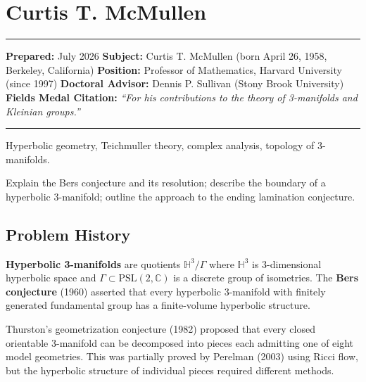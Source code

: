 \chapter{Curtis T. McMullen}\label{ch1998curtistmcmullen:curtis-t-mcmullen-fields-medal-1998-a-comprehensive-report-on-his-work-and-impact}

\begin{center}\rule{0.5\linewidth}{0.5pt}\end{center}

\textbf{Prepared:} July 2026
\textbf{Subject:} Curtis T. McMullen (born April 26, 1958, Berkeley, California)
\textbf{Position:} Professor of Mathematics, Harvard University (since 1997)
\textbf{Doctoral Advisor:} Dennis P. Sullivan (Stony Brook University)
\textbf{Fields Medal Citation:} \emph{``For his contributions to the theory
of 3-manifolds and Kleinian groups.''}

\begin{center}\rule{0.5\linewidth}{0.5pt}\end{center}

\begin{prereqs}
Hyperbolic geometry, Teichmuller theory, complex analysis,
topology of 3-manifolds.
\end{prereqs}

\begin{objectives}
Explain the Bers conjecture and its resolution; describe the
boundary of a hyperbolic 3-manifold; outline the approach to the
ending lamination conjecture.
\end{objectives}

\section{Problem History}

\textbf{Hyperbolic 3-manifolds} are quotients
$\mathbb{H}^3/\Gamma$ where $\mathbb{H}^3$ is 3-dimensional
hyperbolic space and $\Gamma\subset\mathrm{PSL}(2,\mathbb{C})$ is
a discrete group of isometries.  The \textbf{Bers conjecture}
(1960) asserted that every hyperbolic 3-manifold with finitely
generated fundamental group has a finite-volume hyperbolic structure.

Thurston's geometrization conjecture (1982) proposed that every
closed orientable 3-manifold can be decomposed into pieces each
admitting one of eight model geometries.  This was partially proved
by Perelman (2003) using Ricci flow, but the hyperbolic structure
of individual pieces required different methods.


